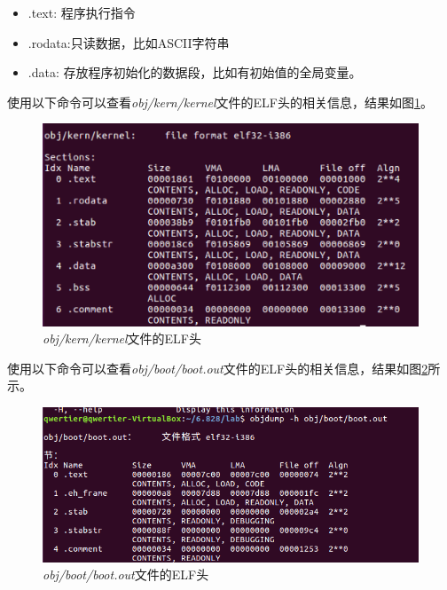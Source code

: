 \begin{ExerciseList}
\begin{itemize}
\item .text: 程序执行指令
\item .rodata:只读数据，比如ASCII字符串
\item .data: 存放程序初始化的数据段，比如有初始值的全局变量。
\end{itemize}

使用以下命令可以查看\emph{obj/kern/kernel}文件的ELF头的相关信息，结果如图\ref{fig:lab1:kernel_elf}。


\begin{figure}[H]
  \centering
  \includegraphics[width=6in]{figures/lab1/kernel_elf.png}
  \caption{\emph{obj/kern/kernel}文件的ELF头}\label{fig:lab1:kernel_elf}
\end{figure}

使用以下命令可以查看\emph{obj/boot/boot.out}文件的ELF头的相关信息，结果如图\ref{fig:lab1:boot_elf}所示。


\begin{figure}[H]
  \centering
  \includegraphics[width=6in]{figures/lab1/boot_elf.png}
  \caption{\emph{obj/boot/boot.out}文件的ELF头}\label{fig:lab1:boot_elf}
\end{figure}


\end{ExerciseList}
